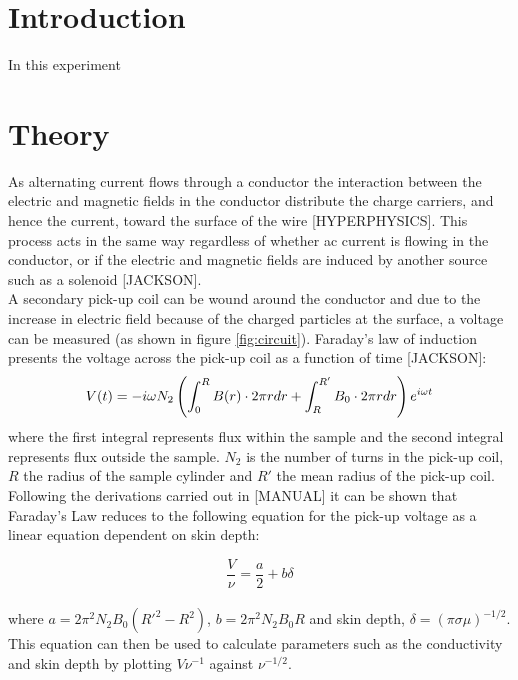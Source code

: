 \documentclass[a4paper,12pt,twocolumn]{article}
\begin{document}
\section{Introduction}
	In this experiment
	
\section{Theory}

	As alternating current flows through a conductor the interaction between the electric and magnetic fields in the conductor distribute the charge carriers, and hence the current, toward the surface of the wire [HYPERPHYSICS]. This process acts in the same way regardless of whether ac current is flowing in the conductor, or if the electric and magnetic fields are induced by another source such as a solenoid [JACKSON].\\
	
	A secondary pick-up coil can be wound around the conductor and due to the increase in electric field because of the charged particles at the surface, a voltage can be measured (as shown in figure \ref{fig:circuit}). Faraday's law of induction presents the voltage across the pick-up coil as a function of time [JACKSON]:
	\begin{equation}
		\scriptsize
		V(t) = - i \omega N_2 \left( \int_{0}^{R} B(r) \cdot 2\pi r dr + \int_{R}^{R'} B_0 \cdot 2\pi r dr \right) e^{i\omega t}
		\label{eq:faraday}
	\end{equation}
	where the first integral represents flux within the sample and the second integral represents flux outside the sample. $N_2$ is the number of turns in the pick-up coil, $R$ the radius of the sample cylinder and $R'$ the mean radius of the pick-up coil.\\
	
	Following the derivations carried out in [MANUAL] it can be shown that Faraday's Law reduces to the following equation for the pick-up voltage as a linear equation dependent on skin depth:
	
	\begin{equation}
		\frac{V}{\nu} = \frac{a}{2} + b\delta
		\label{eq:line}
	\end{equation}\\
	where $a = 2\pi^2 N_2 B_0 (R'^2-R^2)$, $b = 2\pi^2 N_2 B_0 R$ and skin depth, $\delta = (\pi \sigma \mu)^{-1/2}$. This equation can then be used to calculate parameters such as the conductivity and skin depth by plotting $V\nu^{-1}$ against $\nu^{-1/2}$.\\
	
\end{document}
